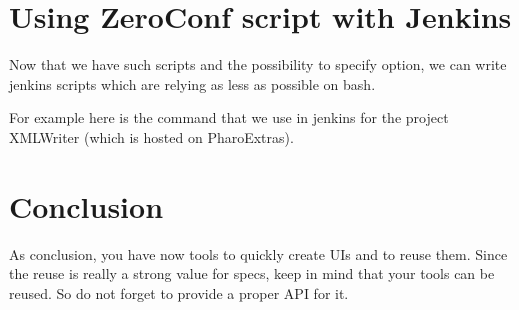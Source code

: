 \documentclass[a4paper,10pt,twoside]{book}
\begin{document}
\section{Using ZeroConf script with Jenkins}
Now that we have such scripts and the possibility to specify option, we can write jenkins scripts which are relying as less as possible on bash. 

For example here is the command that we use in jenkins for the project XMLWriter (which is hosted on PharoExtras). 




\section{Conclusion}
As conclusion, you have now tools to quickly create UIs and to reuse them. Since the reuse is really a strong value for specs, keep in mind that your tools can be reused. So do not forget to provide a proper API for it.

\ifx\wholebook\relax\else
   
   
\end{document}
